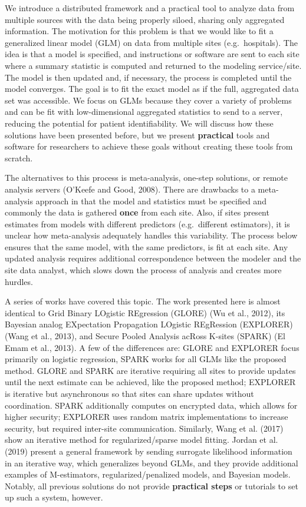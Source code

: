 \documentclass[]{elsarticle} %
\begin{document}
We introduce a distributed framework and a practical tool to analyze data from multiple sources with the data being properly siloed, sharing only aggregated information. The motivation for this problem is that we would like to fit a generalized linear model (GLM) on data from multiple sites (e.g.~hospitals). The idea is that a model is specified, and instructions or software are sent to each site where a summary statistic is computed and returned to the modeling service/site. The model is then updated and, if necessary, the process is completed until the model converges. The goal is to fit the exact model as if the full, aggregated data set was accessible. We focus on GLMs because they cover a variety of problems and can be fit with low-dimensional aggregated statistics to send to a server, reducing the potential for patient identifiability. We will discuss how these solutions have been presented before, but we present \textbf{practical} tools and software for researchers to achieve these goals without creating these tools from scratch.

The alternatives to this process is meta-analysis, one-step solutions, or remote analysis servers (O'Keefe and Good, 2008). There are drawbacks to a meta-analysis approach in that the model and statistics must be specified and commonly the data is gathered \textbf{once} from each site. Also, if sites present estimates from models with different predictors (e.g.~different estimators), it is unclear how meta-analysis adequately handles this variability. The process below ensures that the same model, with the same predictors, is fit at each site. Any updated analysis requires additional correspondence between the modeler and the site data analyst, which slows down the process of analysis and creates more hurdles.

A series of works have covered this topic. The work presented here is almost identical to Grid Binary LOgistic REgression (GLORE) (Wu et al., 2012), its Bayesian analog EXpectation Propagation LOgistic REgRession (EXPLORER) (Wang et al., 2013), and Secure Pooled Analysis acRoss K-sites (SPARK) (El Emam et al., 2013). A few of the differences are: GLORE and EXPLORER focus primarily on logistic regression, SPARK works for all GLMs like the proposed method. GLORE and SPARK are iterative requiring all sites to provide updates until the next estimate can be achieved, like the proposed method; EXPLORER is iterative but asynchronous so that sites can share updates without coordination. SPARK additionally computes on encrypted data, which allows for higher security; EXPLORER uses random matrix implementations to increase security, but required inter-site communication. Similarly, Wang et al. (2017) show an iterative method for regularized/sparse model fitting. Jordan et al. (2019) present a general framework by sending surrogate likelihood information in an iterative way, which generalizes beyond GLMs, and they provide additional examples of M-estimators, regularized/penalized models, and Bayesian models. Notably, all previous solutions do not provide \textbf{practical steps} or tutorials to set up such a system, however.
\end{document}
